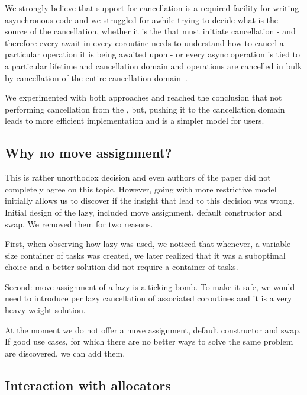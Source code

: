 We strongly believe that support for cancellation is a required facility for writing asynchronous code and we struggled for awhile trying to decide what is the source of the cancellation, whether it is the  that must initiate cancellation - and therefore every await in every coroutine needs to understand how to cancel a particular operation it is being awaited upon - or every async operation is tied to a particular lifetime and cancellation domain and operations are cancelled in bulk by cancellation of the entire cancellation domain~\cite{P0399R0}.

We experimented with both approaches and reached the conclusion that not performing cancellation from the , but, pushing it to the cancellation domain leads to more efficient implementation and is a simpler model for users.

\subsection{Why no move assignment?}

This is rather unorthodox decision and even authors of the paper did not completely agree on this topic. However, going with more restrictive model initially allows us to discover if the insight that lead to this decision was wrong. Initial design of the lazy, included move assignment, default constructor and swap. We removed them for two reasons.

First, when observing how lazy was used, we noticed that whenever, a variable-size container of tasks was created, we later realized that it was a suboptimal choice and a better solution did not require a container of tasks.

Second: move-assignment of a lazy is a ticking bomb. To make it safe, we would need to introduce per lazy cancellation of associated coroutines and it is a very heavy-weight solution.

At the moment we do not offer a move assignment, default constructor and swap. If good use cases, for which there are no better ways to solve the same problem are discovered, we can add them.

\subsection{Interaction with allocators}

